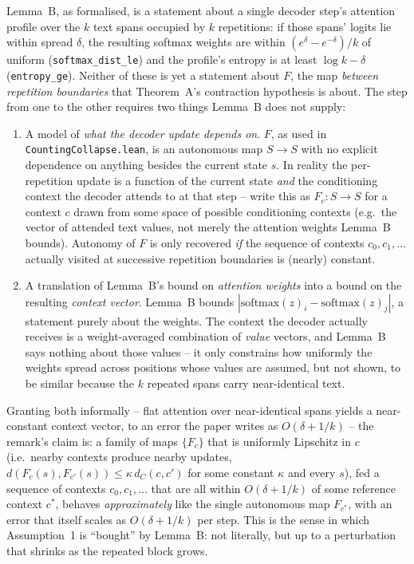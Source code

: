 \documentclass[11pt]{article}
\begin{document}
Lemma~B, as formalised, is a statement about a single decoder step's
attention profile over the $k$ text spans occupied by $k$ repetitions: if
those spans' logits lie within spread $\delta$, the resulting softmax weights
are within $(e^\delta-e^{-\delta})/k$ of uniform (\texttt{softmax\_dist\_le})
and the profile's entropy is at least $\log k - \delta$
(\texttt{entropy\_ge}). Neither of these is yet a statement about $F$, the
map \emph{between repetition boundaries} that Theorem~A's contraction
hypothesis is about. The step from one to the other requires two things
Lemma~B does not supply:

\begin{enumerate}
\item A model of \emph{what the decoder update depends on}. $F$, as used in
  \texttt{CountingCollapse.lean}, is an autonomous map $S\to S$ with no
  explicit dependence on anything besides the current state $s$. In reality
  the per-repetition update is a function of the current state \emph{and} the
  conditioning context the decoder attends to at that step -- write this as
  $F_c : S \to S$ for a context $c$ drawn from some space of possible
  conditioning contexts (e.g.\ the vector of attended text values, not merely
  the attention weights Lemma~B bounds). Autonomy of $F$ is only recovered
  \emph{if} the sequence of contexts $c_0, c_1, \dots$ actually visited at
  successive repetition boundaries is (nearly) constant.
\item A translation of Lemma~B's bound on \emph{attention weights} into a
  bound on the resulting \emph{context vector}. Lemma~B bounds
  $|\mathrm{softmax}(z)_i - \mathrm{softmax}(z)_j|$, a statement purely about
  the weights. The context the decoder actually receives is a
  weight-averaged combination of \emph{value} vectors, and Lemma~B says
  nothing about those values -- it only constrains how uniformly the weights
  spread across positions whose values are assumed, but not shown, to be
  similar because the $k$ repeated spans carry near-identical text.
\end{enumerate}

Granting both informally -- flat attention over near-identical spans yields a
near-constant context vector, to an error the paper writes as
$O(\delta+1/k)$ -- the remark's claim is: a family of maps $\{F_c\}$ that is
uniformly Lipschitz in $c$ (i.e.\ nearby contexts produce nearby updates,
$d(F_c(s), F_{c'}(s)) \le \kappa\, d_C(c,c')$ for some constant $\kappa$ and
every $s$), fed a sequence of contexts $c_0,c_1,\dots$ that are all within
$O(\delta+1/k)$ of some reference context $c^\ast$, behaves \emph{approximately}
like the single autonomous map $F_{c^\ast}$, with an error that itself scales
as $O(\delta+1/k)$ per step. This is the sense in which Assumption~1 is
``bought'' by Lemma~B: not literally, but up to a perturbation that shrinks as
the repeated block grows.
\end{document}
